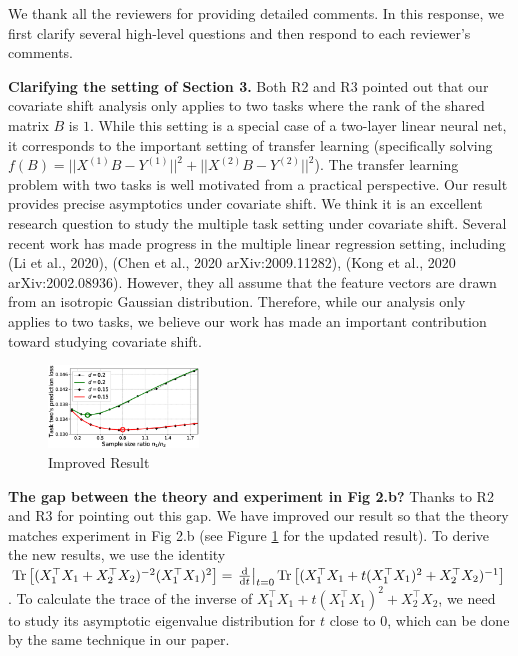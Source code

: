 \documentclass{article}
\begin{document}
	We thank all the reviewers for providing detailed comments.
	In this response, we first clarify several high-level questions and then respond to each reviewer's comments.

	\textbf{Clarifying the setting of Section 3.} Both R2 and R3 pointed out that our covariate shift analysis only applies to two tasks where the rank of the shared matrix $B$ is $1$.
	While this setting is a special case of a two-layer linear neural net, it corresponds to the important setting of transfer learning (specifically solving $f(B) = ||X^{(1)} B - Y^{(1)}||^2 + ||X^{(2)} B - Y^{(2)}||^2$).
	The transfer learning problem with two tasks is well motivated from a practical perspective.
	Our result provides precise asymptotics under covariate shift.
	We think it is an excellent research question to study the multiple task setting under covariate shift.
	Several recent work has made progress in the multiple linear regression setting, including (Li et al., 2020), (Chen et al., 2020 arXiv:2009.11282), (Kong et al., 2020 arXiv:2002.08936).
	However, they all assume that the feature vectors are drawn from an isotropic Gaussian distribution.
	Therefore, while our analysis only applies to two tasks, we believe our work has made an important contribution toward studying covariate shift.



	\begin{figure}
			\vspace{-0.2in}
		\caption{Improved Result}\label{fig_update}
		\includegraphics[width=4.0cm]{sample_ratio_several_d.eps}
		\vspace{-0.4in}
	\end{figure}


\textbf{The gap between the theory and experiment in Fig 2.b?} Thanks to R2 and R3 for pointing out this gap.
	We have improved our result so that the theory matches experiment in Fig 2.b (see Figure \ref{fig_update} for the updated result).
	To derive the new results, we use the identity $\operatorname{Tr}\left[(X_1^\top X_1 + X_2^\top X_2)^{-2}(X_1^\top X_1)^2\right]= \left.\frac{\rm{d}}{{\rm d} t}\right|_{t=0} \operatorname{Tr}\left[(X_1^\top X_1 + t(X_1^\top X_1)^2 + X_2^\top X_2)^{-1}\right]$. To calculate the trace of the inverse of $X_1^\top X_1 + t(X_1^\top X_1)^2 + X_2^\top X_2$, we need to study its asymptotic eigenvalue distribution for $t$ close to 0, which can be done by the same technique in our paper.  %
\end{document}
